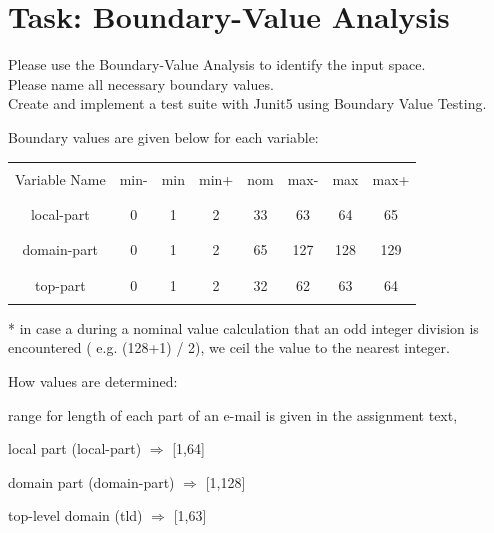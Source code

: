 \documentclass[a4paper,9pt,oneside]{scrreprt}
\begin{document}
\section{Task: Boundary-Value Analysis}
	\begin{enumerate}[a)]
		\item Please use the Boundary-Value Analysis to identify the input space. \\
		Please name all
necessary boundary values.
\\
		Create and implement a test suite with Junit5 using Boundary Value Testing.
		\bigskip
		
			Boundary values are given below for each variable:\\
			\begin{table}[H]
				\centering
				\begin{tabular}{|c|c|c|c|c|c|c|c|}
					
					\hline
					&&&&&&&\\
					Variable Name & min- & min & min+ & nom & max- & max & max+\\
					&&&&&&&\\
					\hline
					&&&&&&&\\
					local-part 	& 0 & 1 & 2 & 33 & 63 & 64 & 65 \\
					&&&&&&&\\
					\hline
					&&&&&&&\\
					domain-part & 0 & 1 & 2 & 65 & 127 & 128 & 129\\
					&&&&&&&\\
					\hline
					&&&&&&&\\
					top-part & 0 & 1 & 2 & 32 & 62 & 63 & 64\\
					&&&&&&&\\
					\hline
				\end{tabular}
				\bigskip
			
					* in case a during a nominal value calculation that an odd integer division  is \\
					encountered ( e.g. (128+1) / 2), we ceil the value to the nearest integer.\\
			\end{table}
		
			How values are determined:
			

\end{compactitem}
\end{enumerate}
\end{document}
